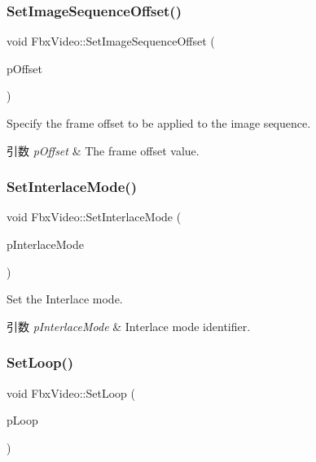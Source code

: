 \subsubsection{\texorpdfstring{Set\+Image\+Sequence\+Offset()}{SetImageSequenceOffset()}}
{\footnotesize\ttfamily void Fbx\+Video\+::\+Set\+Image\+Sequence\+Offset (\begin{DoxyParamCaption}\item[{int}]{p\+Offset }\end{DoxyParamCaption})}

Specify the frame offset to be applied to the image sequence. 
\begin{DoxyParams}{引数}
{\em p\+Offset} & The frame offset value. \\
\hline
\end{DoxyParams}
\mbox{\label{class_fbx_video_aa33fec12f17da41767260e59a3165d05}} 
\subsubsection{\texorpdfstring{Set\+Interlace\+Mode()}{SetInterlaceMode()}}
{\footnotesize\ttfamily void Fbx\+Video\+::\+Set\+Interlace\+Mode (\begin{DoxyParamCaption}\item[{\hyperlink{class_fbx_video_a1e60229c28a15e29289f3f00b23aa215}{E\+Interlace\+Mode}}]{p\+Interlace\+Mode }\end{DoxyParamCaption})}

Set the Interlace mode. 
\begin{DoxyParams}{引数}
{\em p\+Interlace\+Mode} & Interlace mode identifier. \\
\hline
\end{DoxyParams}
\mbox{\label{class_fbx_video_a8fbffbebcc3ef5f170003d0f18ecd7ee}} 
\subsubsection{\texorpdfstring{Set\+Loop()}{SetLoop()}}
{\footnotesize\ttfamily void Fbx\+Video\+::\+Set\+Loop (\begin{DoxyParamCaption}\item[{bool}]{p\+Loop }\end{DoxyParamCaption})}

